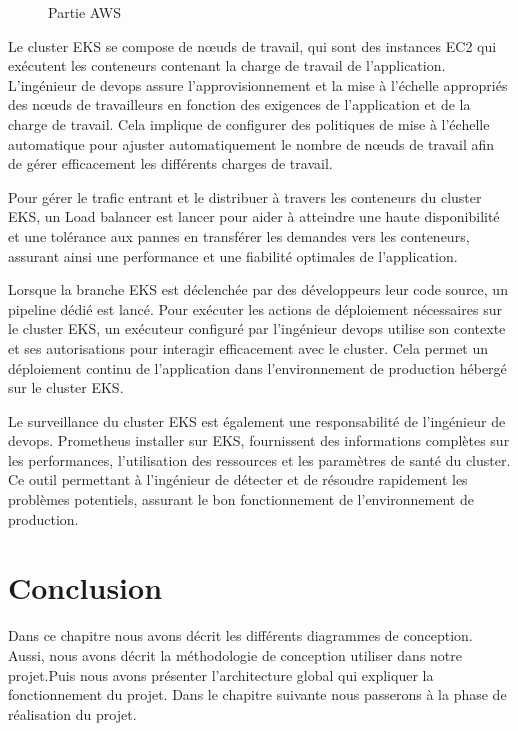 {\begin{figure}[H]
    \caption{Partie AWS}
  \end{figure}
  \indent
 Le cluster EKS se compose de nœuds de travail, qui sont des instances EC2 qui exécutent les conteneurs contenant la charge de travail de l’application. L’ingénieur de devops assure l’approvisionnement et la mise à l’échelle appropriés des nœuds de travailleurs en fonction des exigences de l’application et de la charge de travail. Cela implique de configurer des politiques de mise à l’échelle automatique pour ajuster automatiquement le nombre de nœuds de travail afin de gérer efficacement les différents charges de travail.
 \\[0.01cm]
 \indent
Pour gérer le trafic entrant et le distribuer à travers les conteneurs du cluster EKS, un Load balancer est lancer pour aider à atteindre une haute disponibilité et une tolérance aux pannes en transférer les demandes vers les conteneurs, assurant ainsi une performance et une fiabilité optimales de l’application.
\\[0.01cm]
\indent
{}  
Lorsque la branche EKS est déclenchée par des développeurs  leur code source, un pipeline dédié est lancé. Pour exécuter les actions de déploiement nécessaires sur le cluster EKS, un exécuteur configuré par l’ingénieur devops utilise son contexte et ses autorisations pour interagir efficacement avec le cluster. Cela permet un déploiement continu de l’application dans l’environnement de production hébergé sur le cluster EKS.
\\[0.01cm]
\indent
{}  
Le surveillance du cluster EKS est également une responsabilité de l’ingénieur de devops. Prometheus installer sur EKS, fournissent des informations complètes sur les performances, l’utilisation des ressources et les paramètres de santé du cluster. Ce outil permettant à l’ingénieur de détecter et de résoudre rapidement les problèmes potentiels, assurant le bon fonctionnement de l’environnement de production.
}
 \section{\selectfont\Large Conclusion}
 \textsf{\selectfont{} Dans ce chapitre nous avons décrit les différents diagrammes de conception. Aussi, nous avons décrit la méthodologie de conception utiliser dans notre projet.Puis nous avons présenter l'architecture global qui expliquer la fonctionnement du projet. Dans le chapitre suivante nous passerons à la phase de réalisation du projet.
}

